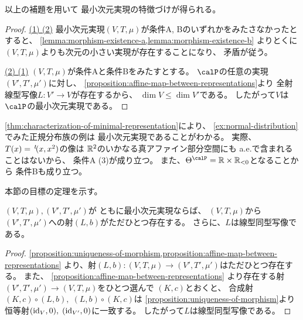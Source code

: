 \documentclass[report]{jlreq}
\begin{document}
以上の補題を用いて
最小次元実現の特徴づけが得られる。


\begin{proof}
    \uline{(1) \Rightarrow (2)} \quad
    最小次元実現$(V, T, \mu)$が条件A, Bのいずれかをみたさなかったとすると、
    \cref{lemma:morphism-existence-a,lemma:morphism-existence-b}
    よりとくに$(V, T, \mu)$よりも次元の小さい実現が存在することになり、
    矛盾が従う。

    \uline{(2) \Rightarrow (1)} \quad
    $(V, T, \mu)$が条件Aと条件Bをみたすとする。
    $\calP$の任意の実現
    $(V', T', \mu')$に対し、
    \cref{proposition:affine-map-between-representations}より
    全射線型写像$L: V' \to V$が存在するから、
    $\dim V \le \dim V'$である。
    したがって$V$は$\calP$の最小次元実現である。
\end{proof}

\begin{example}[正規分布族の最小次元実現]
    \cref{thm:characterization-of-minimal-representation}により、
    \cref{ex:normal-distribution}でみた正規分布族の例は
    最小次元実現であることがわかる。
    実際、
    $T(x) = \,{}^{t}\!(x, x^2)$の像は
    $\mathbb{R}^2$のいかなる真アファイン部分空間にも
    a.e.で含まれることはないから、
    条件A (3)が成り立つ。
    また、$\Theta^\calP = \R \times \R_{< 0}$となることから
    条件Bも成り立つ。
\end{example}

本節の目標の定理を示す。

\begin{theorem}[最小次元実現の間のアファイン変換]
    $(V, T, \mu), (V', T', \mu')$が
    ともに最小次元実現ならば、
    $(V, T, \mu)$から$(V', T', \mu')$への射$(L, b)$がただひとつ存在する。
    さらに、$L$は線型同型写像である。
\end{theorem}

\begin{proof}
    \cref{proposition:uniqueness-of-morphism,proposition:affine-map-between-representations}
    より、射$(L, b) \colon (V, T, \mu) \to (V', T', \mu')$はただひとつ存在する。
    また、
    \cref{proposition:affine-map-between-representations}
    より存在する射$(V', T', \mu') \to (V, T, \mu)$をひとつ選んで
    $(K, c)$とおくと、
    合成射$(K, c) \circ (L, b), \; (L, b) \circ (K, c)$は
    \cref{proposition:uniqueness-of-morphism}より
    恒等射$(\mathrm{id}_V, 0), \; (\mathrm{id}_{V'}, 0)$に一致する。
    したがって$L$は線型同型写像である。
\end{proof}
\end{document}
